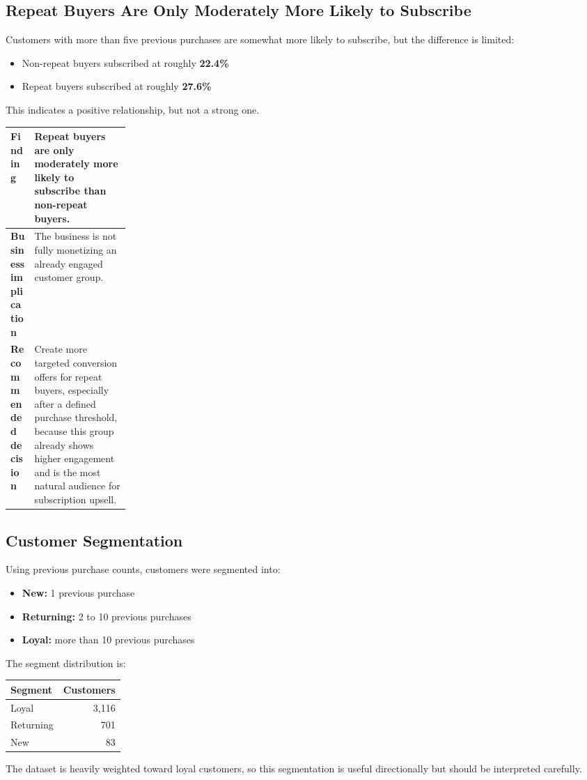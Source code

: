 \documentclass[12pt,a4paper]{article}
\newcommand{\findingbox}[3]{
\begin{center}
\setlength{\arrayrulewidth}{0.6pt}
\renewcommand{\arraystretch}{1.25}
\begin{tabularx}{0.97\linewidth}{|>{\raggedright\arraybackslash\bfseries}p{0.2\linewidth}|X|}
\hline
{\cellcolor{gray!12}Finding} & #1 \\
\hline
{\cellcolor{gray!12}Business implication} & #2 \\
\hline
{\cellcolor{gray!12}Recommended decision} & #3 \\
\hline
\end{tabularx}
\end{center}
}
\begin{document}
\subsection{Repeat Buyers Are Only Moderately More Likely to Subscribe}
Customers with more than five previous purchases are somewhat more likely to subscribe, but the difference is limited:
\begin{itemize}
  \item Non-repeat buyers subscribed at roughly \textbf{22.4\%}
  \item Repeat buyers subscribed at roughly \textbf{27.6\%}
\end{itemize}

This indicates a positive relationship, but not a strong one.

\findingbox
{Repeat buyers are only moderately more likely to subscribe than non-repeat buyers.}
{The business is not fully monetizing an already engaged customer group.}
{Create more targeted conversion offers for repeat buyers, especially after a defined purchase threshold, because this group already shows higher engagement and is the most natural audience for subscription upsell.}

\subsection{Customer Segmentation}
Using previous purchase counts, customers were segmented into:
\begin{itemize}
  \item \textbf{New:} 1 previous purchase
  \item \textbf{Returning:} 2 to 10 previous purchases
  \item \textbf{Loyal:} more than 10 previous purchases
\end{itemize}

The segment distribution is:
\begin{center}
\begin{tabular}{lr}
\toprule
\textbf{Segment} & \textbf{Customers} \\
\midrule
Loyal & 3,116 \\
Returning & 701 \\
New & 83 \\
\bottomrule
\end{tabular}
\end{center}

The dataset is heavily weighted toward loyal customers, so this segmentation is useful directionally but should be interpreted carefully.
\end{document}

